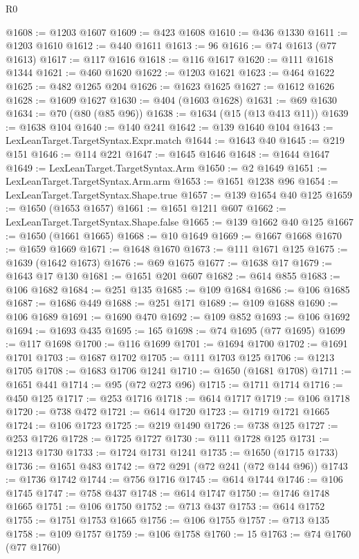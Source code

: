 \begin{lexlean}{R0}
\begin{coremodule}
@1608 := @1203 @1607
@1609 := @423 @1608
@1610 := @436 @1330
@1611 := @1203 @1610
@1612 := @440 @1611
@1613 := 96
@1616 := @74 @1613 (@77 @1613)
@1617 := @117 @1616
@1618 := @116 @1617
@1620 := @111 @1618 @1344
@1621 := @460 @1620
@1622 := @1203 @1621
@1623 := @464 @1622
@1625 := @482 @1265 @204
@1626 := @1623 @1625
@1627 := @1612 @1626
@1628 := @1609 @1627
@1630 := @404 (@1603 @1628)
@1631 := @69 @1630
@1634 := @70 (@80 (@85 @96))
@1638 := @1634 (@15 (@13 @413 @11))
@1639 := @1638 @104
@1640 := @140 @241
@1642 := @139 @1640 @104
@1643 := LexLeanTarget.TargetSyntax.Expr.match
@1644 := @1643 @40
@1645 := @219 @151
@1646 := @114 @221
@1647 := @1645 @1646
@1648 := @1644 @1647
@1649 := LexLeanTarget.TargetSyntax.Arm
@1650 := @2 @1649
@1651 := LexLeanTarget.TargetSyntax.Arm.arm
@1653 := @1651 @1238 @96
@1654 := LexLeanTarget.TargetSyntax.Shape.true
@1657 := @139 @1654 @40 @125
@1659 := @1650 (@1653 @1657)
@1661 := @1651 @1211 @607
@1662 := LexLeanTarget.TargetSyntax.Shape.false
@1665 := @139 @1662 @40 @125
@1667 := @1650 (@1661 @1665)
@1668 := @10 @1649
@1669 := @1667 @1668
@1670 := @1659 @1669
@1671 := @1648 @1670
@1673 := @111 @1671 @125
@1675 := @1639 (@1642 @1673)
@1676 := @69 @1675
@1677 := @1638 @17
@1679 := @1643 @17 @130
@1681 := @1651 @201 @607
@1682 := @614 @855
@1683 := @106 @1682
@1684 := @251 @135
@1685 := @109 @1684
@1686 := @106 @1685
@1687 := @1686 @449
@1688 := @251 @171
@1689 := @109 @1688
@1690 := @106 @1689
@1691 := @1690 @470
@1692 := @109 @852
@1693 := @106 @1692
@1694 := @1693 @435
@1695 := 165
@1698 := @74 @1695 (@77 @1695)
@1699 := @117 @1698
@1700 := @116 @1699
@1701 := @1694 @1700
@1702 := @1691 @1701
@1703 := @1687 @1702
@1705 := @111 @1703 @125
@1706 := @1213 @1705
@1708 := @1683 @1706 @1241
@1710 := @1650 (@1681 @1708)
@1711 := @1651 @441
@1714 := @95 (@72 @273 @96)
@1715 := @1711 @1714
@1716 := @450 @125
@1717 := @253 @1716
@1718 := @614 @1717
@1719 := @106 @1718
@1720 := @738 @472
@1721 := @614 @1720
@1723 := @1719 @1721 @1665
@1724 := @106 @1723
@1725 := @219 @1490
@1726 := @738 @125
@1727 := @253 @1726
@1728 := @1725 @1727
@1730 := @111 @1728 @125
@1731 := @1213 @1730
@1733 := @1724 @1731 @1241
@1735 := @1650 (@1715 @1733)
@1736 := @1651 @483
@1742 := @72 @291 (@72 @241 (@72 @144 @96))
@1743 := @1736 @1742
@1744 := @756 @1716
@1745 := @614 @1744
@1746 := @106 @1745
@1747 := @758 @437
@1748 := @614 @1747
@1750 := @1746 @1748 @1665
@1751 := @106 @1750
@1752 := @713 @437
@1753 := @614 @1752
@1755 := @1751 @1753 @1665
@1756 := @106 @1755
@1757 := @713 @135
@1758 := @109 @1757
@1759 := @106 @1758
@1760 := 15
@1763 := @74 @1760 (@77 @1760)

\end{coremodule}
\end{lexlean}
